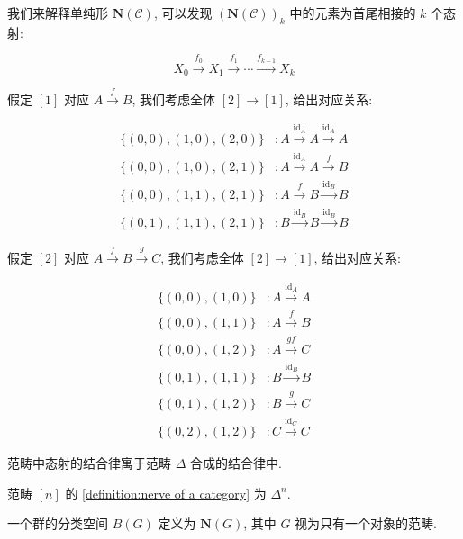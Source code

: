 \begin{remark}
    我们来解释单纯形 \(\mathbf{N} (\mathcal{C})\), 可以发现 \({(\mathbf{N} (\mathcal{C}))}_k\) 中的元素为首尾相接的 \(k\) 个态射:

    \[
        X_0 \xrightarrow{f_0} X_1 \xrightarrow{f_1} \cdots \xrightarrow{f_{k-1}} X_k
    \]

    假定 \([1]\) 对应 \(A \xrightarrow{f} B\), 我们考虑全体 \([2] \to [1]\), 给出对应关系:

    \[
        \begin{aligned}
            \{(0,0),(1,0),(2,0)\} &: A \xrightarrow{\mathrm{id}_A} A \xrightarrow{\mathrm{id}_A} A \\
            \{(0,0),(1,0),(2,1)\} &: A \xrightarrow{\mathrm{id}_A} A \xrightarrow{f} B \\
            \{(0,0),(1,1),(2,1)\} &: A \xrightarrow{f} B \xrightarrow{\mathrm{id}_B} B \\
            \{(0,1),(1,1),(2,1)\} &: B \xrightarrow{\mathrm{id}_B} B \xrightarrow{\mathrm{id}_B} B
        \end{aligned}
    \]

    假定 \([2]\) 对应 \(A \xrightarrow{f} B \xrightarrow{g} C\), 我们考虑全体 \([2] \to [1]\), 给出对应关系:

    \[
        \begin{aligned}
            \{(0,0),(1,0)\} &: A \xrightarrow{\mathrm{id}_A} A \\
            \{(0,0),(1,1)\} &: A \xrightarrow{f} B \\
            \{(0,0),(1,2)\} &: A \xrightarrow{gf} C \\
            \{(0,1),(1,1)\} &: B \xrightarrow{\mathrm{id}_B} B \\
            \{(0,1),(1,2)\} &: B \xrightarrow{g} C \\
            \{(0,2),(1,2)\} &: C \xrightarrow{\mathrm{id}_C} C
        \end{aligned}
    \]

    范畴中态射的结合律寓于范畴 \(\Delta\) 合成的结合律中.
\end{remark}

\begin{lemma}
    范畴 \([n]\) 的 \ref{definition:nerve of a category} 为 \(\Delta^n\).
\end{lemma}

\begin{definition}
    一个群的分类空间 \(B(G)\) 定义为 \(\mathbf{N} (G)\), 其中 \(G\) 视为只有一个对象的范畴.
\end{definition}

